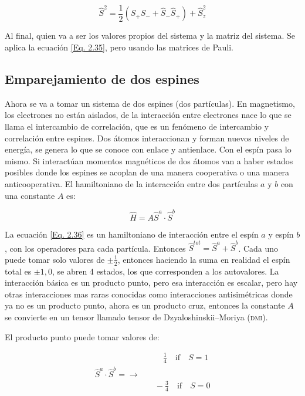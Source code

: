 \documentclass[11pt,fleqn]{book}
\begin{document}
\begin{equation}
    \hat{S}^{2}=\frac{1}{2}\left(\hat{S}_{+}\hat{S}_{-}+\hat{S}_{-}\hat{S}_{+}\right)+\hat{S}^{2}_{z}
    \label{Eq. 2.35}
\end{equation}

Al final, quien va a ser los valores propios del sistema y la matriz del sistema. Se aplica la ecuación \ref{Eq. 2.35}, pero usando las matrices de Pauli.

\subsection{Emparejamiento de dos espines}

Ahora se va a tomar un sistema de dos espines (dos partículas). En magnetismo, los electrones no están aislados, de la interacción entre electrones nace lo que se llama el intercambio de correlación, que es un fenómeno de intercambio y correlación entre espines. Dos átomos interaccionan y forman nuevos niveles de energía, se genera lo que se conoce con enlace y antienlace. Con el espín pasa lo mismo. Si interactúan momentos magnéticos de dos átomos van a haber estados posibles donde los espines se acoplan de una manera cooperativa o una manera anticooperativa. El hamiltoniano de la interacción entre dos partículas $a$ y $b$ con una constante $A$ es:

\begin{equation}
    \hat{H}=A\hat{S}^{a}\cdot\hat{S}^{b}
    \label{Eq. 2.36}
\end{equation}

La ecuación \ref{Eq. 2.36} es un hamiltoniano de interacción entre el espín $a$ y espín $b$, con los operadores para cada partícula. Entonces $\hat{S}^{tot}=\hat{S}^{a}+\hat{S}^{b}$. Cada uno puede tomar solo valores de $\pm\frac{1}{2}$, entonces haciendo la suma en realidad el espín total es $\pm 1, 0$, se abren 4 estados, los que corresponden a los autovalores. La interacción básica es un producto punto, pero esa interacción es escalar, pero hay otras interacciones mas raras conocidas como interacciones antisimétricas donde ya no es un producto punto, ahora es un producto cruz, entonces la constante $A$ se convierte en un tensor llamado tensor de Dzyaloshinskii–Moriya (\textsc{dmi}).

El producto punto puede tomar valores de:

\begin{equation*}
\begin{split}
    &\qquad\frac{1}{4}\quad\text{if}\quad S=1\\
    \hat{S}^{a}\cdot\hat{S}^{b}=\longrightarrow&\\
    &\quad-\frac{3}{4}\quad\text{if}\quad S=0
\end{split}
\end{equation*}
\end{document}
